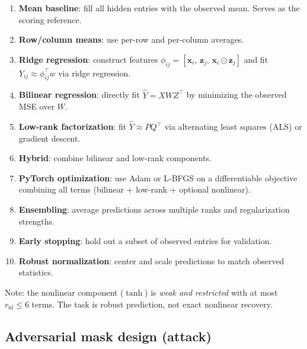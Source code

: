 \documentclass[11pt,a4paper]{article}
\begin{document}
\begin{enumerate}
  \item \textbf{Mean baseline}: fill all hidden entries with the observed mean.
        Serves as the scoring reference.
  \item \textbf{Row/column means}: use per-row and per-column averages.
  \item \textbf{Ridge regression}: construct features
        $\phi_{ij} = [\mathbf{x}_i,\, \mathbf{z}_j,\, \mathbf{x}_i \odot \mathbf{z}_j]$
        and fit $Y_{ij} \approx \phi_{ij}^\top w$ via ridge regression.
  \item \textbf{Bilinear regression}: directly fit $\hat{Y} = X W Z^\top$
        by minimizing the observed MSE over $W$.
  \item \textbf{Low-rank factorization}: fit $\hat{Y} \approx P Q^\top$
        via alternating least squares (ALS) or gradient descent.
  \item \textbf{Hybrid}: combine bilinear and low-rank components.
  \item \textbf{PyTorch optimization}: use Adam or L-BFGS on a differentiable objective
        combining all terms (bilinear + low-rank + optional nonlinear).
  \item \textbf{Ensembling}: average predictions across multiple ranks and regularization strengths.
  \item \textbf{Early stopping}: hold out a subset of observed entries for validation.
  \item \textbf{Robust normalization}: center and scale predictions to match observed statistics.
\end{enumerate}

Note: the nonlinear component ($\tanh$) is \emph{weak and restricted} with at most
$r_{\text{nl}} \leq 6$ terms. The task is robust prediction, not exact nonlinear recovery.

\subsection{Adversarial mask design (attack)}
\end{document}
